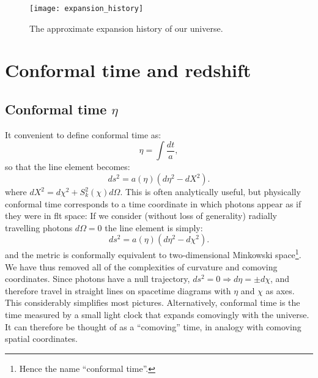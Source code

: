 \begin{figure}
  \centering
  \texttt{[image: expansion\_history]}
  \caption{The approximate expansion history of our universe.\label{fig:cos:expansion_history}}
\end{figure}


\section{Conformal time and redshift}
\subsection{Conformal time $\eta$}

It convenient to define conformal time as:
\begin{equation}
  \eta = \int \frac{dt}{a},
  \label{eqn:cos:conformal_time}
\end{equation}
so that the line element becomes:
\begin{equation}          
  ds^2 = a(\eta)\left( d\eta^2 - dX^2 \right).
  \label{eqn:cos:flat_FRW}
\end{equation}
where $dX^2 = d\chi^2 + S_k^2(\chi) d\Omega$.
This is often analytically useful, but physically conformal time corresponds to a time coordinate in which photons appear as if they were in flt space: If we consider (without loss of generality) radially travelling photons $d\Omega=0$ the line element is simply:
\begin{equation}          
  ds^2 = a(\eta)\left( d\eta^2 - d\chi^2 \right).
  \label{eqn:cos:flat_FRW}
\end{equation}
and the metric is conformally equivalent to two-dimensional Minkowski space\footnote{Hence the name ``conformal time''.}. We have thus removed all of the complexities of curvature and comoving coordinates. Since photons have a null trajectory, $ds^2=0\Rightarrow d\eta = \pm d\chi$, and therefore  travel in straight lines on spacetime diagrams with $\eta$ and $\chi$ as axes. This considerably simplifies most pictures.
Alternatively, conformal time is the time measured by a small light clock that expands comovingly with the universe. It can therefore be thought of as a ``comoving'' time, in analogy with comoving spatial coordinates.

